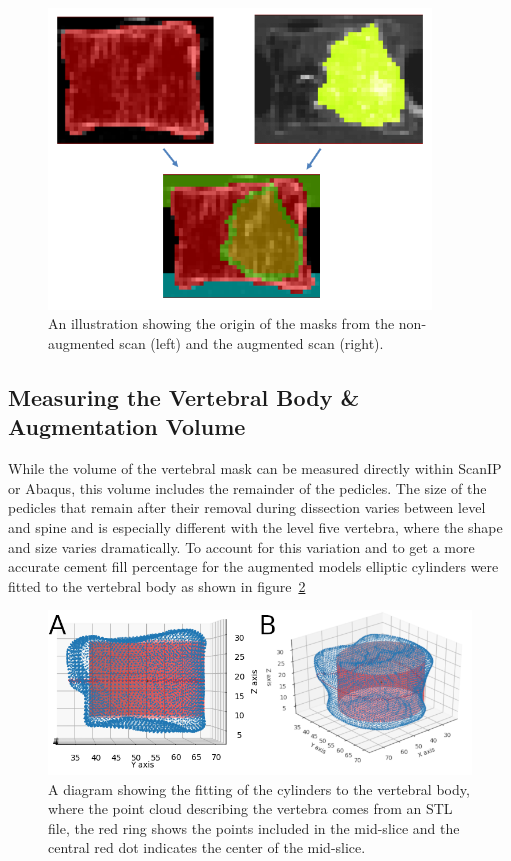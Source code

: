 \begin{figure}[ht!]
  \centering
  \includegraphics[width=4in]{Chapters/Chapter_HT_images/mask_demo.png}
  \caption{An illustration showing the origin of the masks from the non-augmented scan (left) and the augmented scan (right).}
  \label{fig:mask_demo}
\end{figure}


\subsection{Measuring the Vertebral Body \& Augmentation Volume}

While the volume of the vertebral mask can be measured directly within ScanIP or Abaqus, this volume includes the remainder of the pedicles.
The size of the pedicles that remain after their removal during dissection varies between level and spine and is especially different with the level five vertebra, where the shape and size varies dramatically.
To account for this variation and to get a more accurate cement fill percentage for the augmented models elliptic cylinders were fitted to the vertebral body as shown in figure~\ref{fig:cyl_fit}



\begin{figure}[ht!]
  \centering
  \includegraphics[width=5in]{Chapters/Chapter_HT_images/cyl_fit_ful_iso_both.png}
  \caption{A diagram showing the fitting of the cylinders to the vertebral body, where the point cloud describing the vertebra comes from an STL file, the red ring shows the points included in the mid-slice and the central red dot indicates the center of the mid-slice.}
  \label{fig:cyl_fit}
\end{figure}

